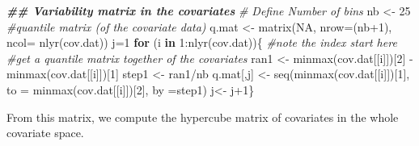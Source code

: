 \documentclass[
  10pt,
  b5paper,
  oneside]{book}
\newenvironment{Shaded}{\begin{snugshade}}{\end{snugshade}}
\newcommand{\AttributeTok}[1]{\textcolor[rgb]{0.77,0.63,0.00}{#1}}
\newcommand{\CommentTok}[1]{\textcolor[rgb]{0.56,0.35,0.01}{\textit{#1}}}
\newcommand{\ConstantTok}[1]{\textcolor[rgb]{0.00,0.00,0.00}{#1}}
\newcommand{\ControlFlowTok}[1]{\textcolor[rgb]{0.13,0.29,0.53}{\textbf{#1}}}
\newcommand{\DecValTok}[1]{\textcolor[rgb]{0.00,0.00,0.81}{#1}}
\newcommand{\DocumentationTok}[1]{\textcolor[rgb]{0.56,0.35,0.01}{\textbf{\textit{#1}}}}
\newcommand{\FunctionTok}[1]{\textcolor[rgb]{0.00,0.00,0.00}{#1}}
\newcommand{\NormalTok}[1]{#1}
\newcommand{\OtherTok}[1]{\textcolor[rgb]{0.56,0.35,0.01}{#1}}
\newcommand{\SpecialCharTok}[1]{\textcolor[rgb]{0.00,0.00,0.00}{#1}}
\begin{document}
\begin{Shaded}
\begin{Highlighting}[]
  \DocumentationTok{\#\# Variability matrix in the covariates}
    \CommentTok{\# Define Number of bins}
\NormalTok{      nb }\OtherTok{\textless{}{-}} \DecValTok{25}
      \CommentTok{\#quantile matrix (of the covariate data)}
\NormalTok{      q.mat }\OtherTok{\textless{}{-}} \FunctionTok{matrix}\NormalTok{(}\ConstantTok{NA}\NormalTok{, }\AttributeTok{nrow=}\NormalTok{(nb}\SpecialCharTok{+}\DecValTok{1}\NormalTok{), }\AttributeTok{ncol=} \FunctionTok{nlyr}\NormalTok{(cov.dat))}
\NormalTok{      j}\OtherTok{=}\DecValTok{1}
      \ControlFlowTok{for}\NormalTok{ (i }\ControlFlowTok{in} \DecValTok{1}\SpecialCharTok{:}\FunctionTok{nlyr}\NormalTok{(cov.dat))\{ }\CommentTok{\#note the index start here}
      \CommentTok{\#get a quantile matrix together of the covariates}
\NormalTok{        ran1 }\OtherTok{\textless{}{-}} \FunctionTok{minmax}\NormalTok{(cov.dat[[i]])[}\DecValTok{2}\NormalTok{] }\SpecialCharTok{{-}} \FunctionTok{minmax}\NormalTok{(cov.dat[[i]])[}\DecValTok{1}\NormalTok{]}
\NormalTok{        step1 }\OtherTok{\textless{}{-}}\NormalTok{ ran1}\SpecialCharTok{/}\NormalTok{nb }
\NormalTok{        q.mat[,j] }\OtherTok{\textless{}{-}} \FunctionTok{seq}\NormalTok{(}\FunctionTok{minmax}\NormalTok{(cov.dat[[i]])[}\DecValTok{1}\NormalTok{], }\AttributeTok{to =} \FunctionTok{minmax}\NormalTok{(cov.dat[[i]])[}\DecValTok{2}\NormalTok{], }\AttributeTok{by =}\NormalTok{step1)}
\NormalTok{        j}\OtherTok{\textless{}{-}}\NormalTok{ j}\SpecialCharTok{+}\DecValTok{1}\NormalTok{\}}
\end{Highlighting}
\end{Shaded}

From this matrix, we compute the hypercube matrix of covariates in the whole covariate space.
\end{document}
